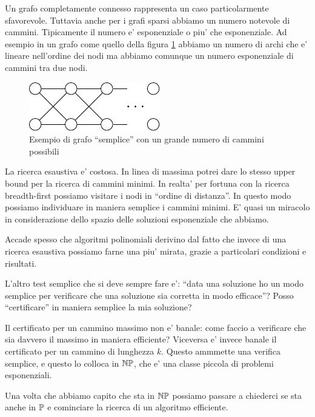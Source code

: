 Un grafo completamente connesso rappresenta un caso particolarmente sfavorevole. Tuttavia anche per
i grafi sparsi abbiamo un numero notevole di cammini. Tipicamente il numero e' esponenziale o piu'
che esponenziale. Ad esempio in un grafo come quello della figura \ref{PathsNumber} abbiamo un
numero di archi che e' lineare nell'ordine dei nodi ma abbiamo comunque un numero esponenziale di
cammini tra due nodi.

\begin{figure}[h]
    \begin{center}
        \includegraphics{img/ExponentialPathsNumber.pdf}
    \end{center}
    \caption{Esempio di grafo ``semplice'' con un grande numero di cammini possibili}
    \label{PathsNumber}
\end{figure}

La ricerca esaustiva e' costosa. In linea di massima potrei dare lo stesso upper bound per la
ricerca di cammini minimi. In realta' per fortuna con la ricerca breadth-first possiamo visitare i
nodi in ``ordine di distanza''. In questo modo possiamo individuare in maniera semplice i cammini
minimi. E' quasi un miracolo in considerazione dello spazio delle soluzioni esponenziale che
abbiamo. 

Accade spesso che algoritmi polinomiali derivino dal fatto che invece di una ricerca esaustiva
possiamo farne una piu' mirata, grazie a particolari condizioni e risultati.

L'altro test semplice che si deve sempre fare e': ``data una soluzione ho un modo semplice per
verificare che una soluzione sia corretta in modo efficace''? Posso ``certificare'' in maniera
semplice la mia soluzione?

Il certificato per un cammino massimo non e' banale: come faccio a verificare che sia davvero il
massimo in maniera efficiente? Viceversa e' invece banale il certificato per un cammino di lunghezza
$k$. Questo ammmette una verifica semplice, e questo lo colloca in $\mathbb{NP}$, che e' una classe
piccola di problemi esponenziali.

Una volta che abbiamo capito che sta in $\mathbb{NP}$ possiamo passare a chiederci se sta anche in
$\mathbb{P}$ e cominciare la ricerca di un algoritmo efficiente.

